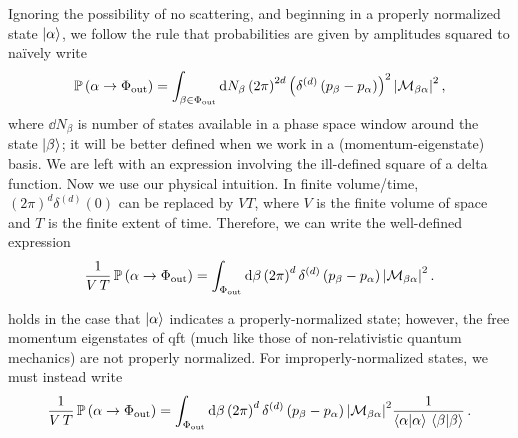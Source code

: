 Ignoring the possibility of no scattering, and beginning in a properly normalized state \(\ket{\alpha}\), we follow the rule that probabilities are given by amplitudes squared to na\"ively write
\begin{align}
    \mathbb{P}\left(\alpha \to \Phi_\text{out}\right)
    =
    \int_{\beta \in \Phi_\text{out}}
    \dd N_\beta
    \left(2 \pi\right)^{2d}
    \left(\delta^{(d)}\left(p_\beta - p_\alpha\right)\right)^2
    \abs{\mathcal{M}_{\beta\alpha}}^2
    \,,
\end{align}
where \(\dd N_\beta\) is  number of states available in a phase space window around the state \(\ket{\beta}\);
%
it will be better defined when we work in a (momentum-eigenstate) basis.
%
We are left with an expression involving the ill-defined square of a delta function.
%
Now we use our physical intuition.
%
In finite volume/time, \((2\pi)^d \delta^{(d)}(0)\) can be replaced by \(V T\), where \(V\) is the finite volume of space and \(T\) is the finite extent of time.
%
Therefore, we can write the well-defined expression
\begin{align}
    \label{eq:probability-propertly-normalized}
    \frac{1}{V\,T}
    \,
    \mathbb{P}\le(\alpha \to \Phi_\text{out}\ri)
    =
    \int_{\Phi_\text{out}}
    \dd \beta
    \le(2 \pi\ri)^{d}
    \delta^{(d)}\le(p_\beta - p_\alpha\ri)
    \abs{\mathcal{M}_{\beta\alpha}}^2
    \,.
\end{align}

 holds in the case that \(\ket{\alpha}\) indicates a properly-normalized state;
%
however, the free momentum eigenstates of \gls{qft} (much like those of non-relativistic quantum mechanics) are not properly normalized.
%
For improperly-normalized states, we must instead write
\begin{align}
    \label{eq:probability-not-normalized}
    \frac{1}{V\,T}
    \,
    \mathbb{P}\le(\alpha \to \Phi_\text{out}\ri)
    =
    \int_{\Phi_\text{out}}
    \dd \beta
    \le(2 \pi\ri)^{d}
    \delta^{(d)}\le(p_\beta - p_\alpha\ri)
    \abs{\mathcal{M}_{\beta\alpha}}^2
    \frac{1}{\braket{\alpha}{\alpha}\,\braket{\beta}{\beta}}
    \,.
\end{align}

